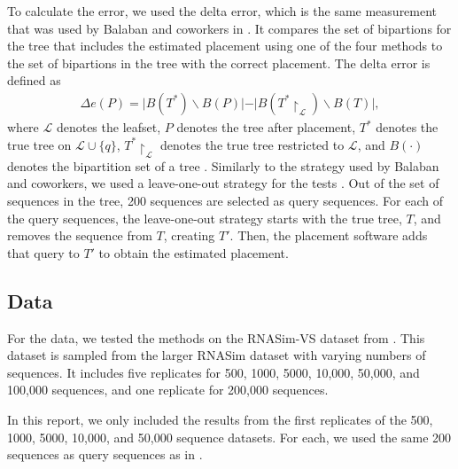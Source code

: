 \documentclass[10pt]{article}
\begin{document}
To calculate the error, we used the delta error, which is the same measurement that was used by
Balaban and coworkers in \cite{balaban_apples_2020}.
It compares the set of bipartions for the tree that includes the estimated placement using one of the four methods to the set of bipartions in the tree with the correct placement.
The delta error is defined as
\begin{align*}
\Delta e(P) = \vert B(T^*) \backslash B(P) \vert - \vert B(T^* \upharpoonright_{\mathcal L}) \backslash B(T)\vert,
\end{align*}
where $\mathcal L$ denotes the leafset, \(P\) denotes the tree after placement, $T^*$ denotes the true tree on $\mathcal L \cup \{q\}$, $T^* \upharpoonright_{\mathcal L}$ denotes the true tree restricted to $\mathcal L$, and $B(\cdot)$ denotes the bipartition set of a tree \cite{balaban_apples_2020}.
Similarly to the strategy used by Balaban and coworkers, we used a leave-one-out strategy for the tests \cite{balaban_apples_2020}.
Out of the set of sequences in the tree, 200 sequences are selected as query sequences.
For each of the query sequences, the leave-one-out strategy starts with the true tree, \(T\), and removes the sequence from \(T\), creating \(T'\).
Then, the placement software adds that query to \(T'\) to obtain the estimated placement.

\subsection{Data}

For the data, we tested the methods on the RNASim-VS dataset from \cite{balaban_apples_2020}. This dataset is sampled from the larger RNASim dataset with varying numbers of sequences. It includes five replicates for 500, 1000, 5000, 10,000, 50,000, and 100,000 sequences, and one replicate for 200,000 sequences.

In this report, we only included the results from the first replicates of the 500, 1000, 5000, 10,000, and 50,000 sequence datasets. For each, we used the same 200 sequences as query sequences as in \cite{balaban_apples_2020}.

\end{document}
